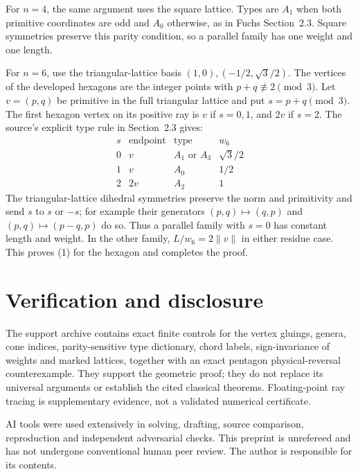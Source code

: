 \documentclass[11pt]{article}
\begin{document}
For \(n=4\), the same argument uses the square lattice. Types are \(A_1\) when both primitive coordinates are odd and \(A_0\) otherwise, as in Fuchs Section~2.3. Square symmetries preserve this parity condition, so a parallel family has one weight and one length.

For \(n=6\), use the triangular-lattice basis \((1,0),(-1/2,\sqrt3/2)\). The vertices of the developed hexagons are the integer points with \(p+q\not\equiv2\pmod3\). Let \(v=(p,q)\) be primitive in the full triangular lattice and put \(s=p+q\pmod3\). The first hexagon vertex on its positive ray is \(v\) if \(s=0,1\), and \(2v\) if \(s=2\). The source's explicit type rule in Section~2.3 gives:
\[
\begin{array}{c|c|c|c}
s&\text{endpoint}&\text{type}&w_6\\ \hline
0&v&A_1\text{ or }A_3&\sqrt3/2\\
1&v&A_0&1/2\\
2&2v&A_2&1
\end{array}
\]
The triangular-lattice dihedral symmetries preserve the norm and primitivity and send \(s\) to \(s\) or \(-s\); for example their generators \((p,q)\mapsto(q,p)\) and \((p,q)\mapsto(p-q,p)\) do so. Thus a parallel family with \(s=0\) has constant length and weight. In the other family, \(L/w_6=2\|v\|\) in either residue case. This proves (1) for the hexagon and completes the proof.


\section*{Verification and disclosure}
The support archive contains exact finite controls for the vertex gluings, genera, cone indices, parity-sensitive type dictionary, chord labels, sign-invariance of weights and marked lattices, together with an exact pentagon physical-reversal counterexample. They support the geometric proof; they do not replace its universal arguments or establish the cited classical theorems. Floating-point ray tracing is supplementary evidence, not a validated numerical certificate.

AI tools were used extensively in solving, drafting, source comparison, reproduction and independent adversarial checks. This preprint is unrefereed and has not undergone conventional human peer review. The author is responsible for its contents.
\end{document}
